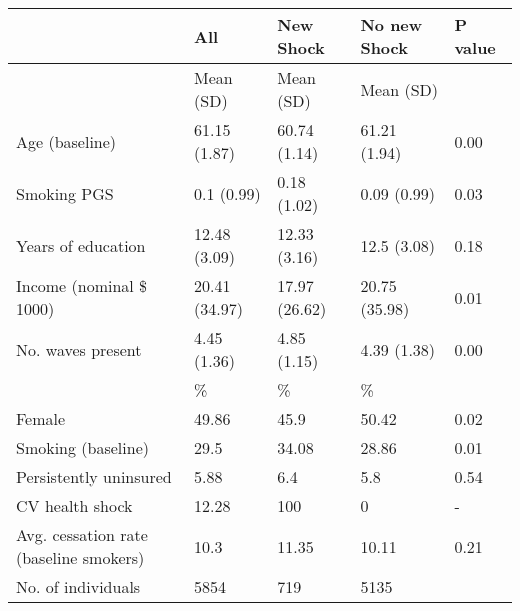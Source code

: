 % 
\begin{tabular}{lllll}
  \toprule
\textbf{  } & \textbf{ All } & \textbf{ New Shock } & \textbf{ No new Shock } & \textbf{ P value } \\ 
  \midrule
 & Mean (SD) & Mean (SD) & Mean (SD) &  \\ 
   \midrule
Age (baseline) & 61.15 (1.87) & 60.74 (1.14) & 61.21 (1.94) & 0.00 \\ 
  Smoking PGS & 0.1 (0.99) & 0.18 (1.02) & 0.09 (0.99) & 0.03 \\ 
  Years of education & 12.48 (3.09) & 12.33 (3.16) & 12.5 (3.08) & 0.18 \\ 
  Income (nominal \$ 1000) & 20.41 (34.97) & 17.97 (26.62) & 20.75 (35.98) & 0.01 \\ 
  No. waves present & 4.45 (1.36) & 4.85 (1.15) & 4.39 (1.38) & 0.00 \\ 
   & \% & \% & \% &  \\ 
  Female & 49.86 & 45.9 & 50.42 & 0.02 \\ 
  Smoking (baseline) & 29.5 & 34.08 & 28.86 & 0.01 \\ 
  Persistently uninsured & 5.88 & 6.4 & 5.8 & 0.54 \\ 
  CV health shock & 12.28 & 100 & 0 & - \\ 
  Avg. cessation rate (baseline smokers) & 10.3 & 11.35 & 10.11 & 0.21 \\ 
  No. of individuals & 5854 & 719 & 5135 &  \\ 
   \bottomrule
\end{tabular}
